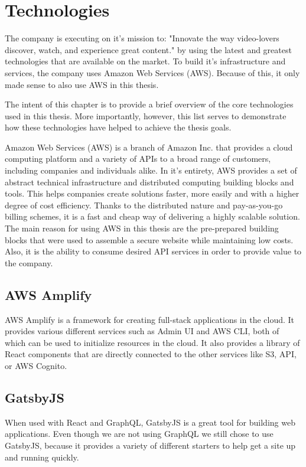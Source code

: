 \documentclass[12pt,oneside]{fithesis2}
\begin{document}
\section{Technologies}
The company is executing on it's mission to: "Innovate the way video-lovers discover, watch, and experience great content."\cite{24iMission} by using the latest and greatest technologies that are available on the market. To build it's infrastructure and services, the company uses Amazon Web Services (AWS). Because of this, it only made sense to also use AWS in this thesis.

The intent of this chapter is to provide a brief overview of the core technologies used in this thesis. More importantly, however, this list serves to demonstrate how these technologies have helped to achieve the thesis goals.

Amazon Web Services (AWS) is a branch of Amazon Inc. that provides a cloud computing platform and a variety of APIs to a broad range of customers, including companies and individuals alike. In it's entirety, AWS provides a set of abstract technical infrastructure and distributed computing building blocks and tools. This helps companies create solutions faster, more easily and with a higher degree of cost efficiency. \cite{what-is-aws} Thanks to the distributed nature and pay-as-you-go billing schemes, it is a fast and cheap way of delivering a highly scalable solution. \cite{aws-pricing}
\newline\newline
The main reason for using AWS in this thesis are the pre-prepared building blocks that were used to assemble a secure website while maintaining low costs. Also, it is the ability to consume desired API services in order to provide value to the company.
\subsection*{AWS Amplify}
AWS Amplify is a framework for creating full-stack applications in the cloud. It provides various different services such as Admin UI and AWS CLI, both of which can be used to initialize resources in the cloud. It also provides a library of React components that are directly connected to the other services like S3, API, or AWS Cognito.
\subsection*{GatsbyJS}
When used with React and GraphQL, GatsbyJS is a great tool for building web applications. Even though we are not using GraphQL we still chose to use GatsbyJS, because it provides a variety of different starters to help get a site up and running quickly.
\end{document}
